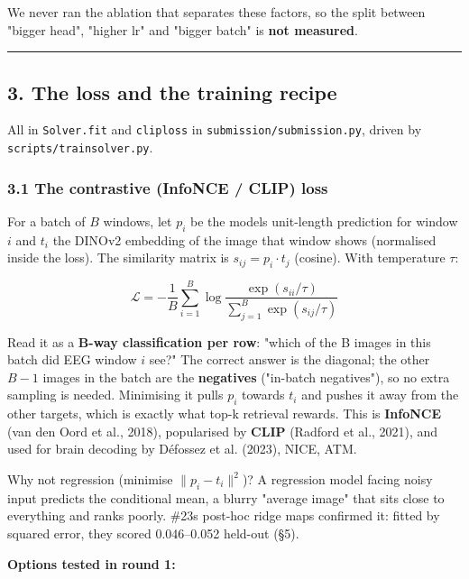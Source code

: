 \documentclass[
  11pt,
]{article}
\renewcommand{\_}{\oldunderscore\allowbreak}
\begin{document}
We never ran the ablation that separates
these factors, so the split between
"bigger head", "higher lr" and "bigger
batch" is \textbf{not measured}.

\begin{center}\rule{0.5\linewidth}{0.5pt}\end{center}

\subsection{3. The loss and the training
recipe}\label{the-loss-and-the-training-recipe}

All in \texttt{Solver.fit} and
\texttt{clip\_loss} in
\texttt{submission/submission.py},
driven by
\texttt{scripts/train\_solver.py}.

\subsubsection{3.1 The contrastive
(InfoNCE / CLIP)
loss}\label{the-contrastive-infonce-clip-loss}

For a batch of \(B\) windows, let
\(p_i\) be the model\textquotesingle s
unit-length prediction for window \(i\)
and \(t_i\) the DINOv2 embedding of the
image that window shows (normalised
inside the loss). The similarity matrix
is \(s_{ij} = p_i \cdot t_j\) (cosine).
With temperature \(\tau\):

\[
\mathcal{L} = -\frac{1}{B}\sum_{i=1}^{B} \log \frac{\exp(s_{ii}/\tau)}{\sum_{j=1}^{B}\exp(s_{ij}/\tau)}
\]

Read it as a \textbf{B-way
classification per row}: "which of the B
images in this batch did EEG window
\(i\) see?" The correct answer is the
diagonal; the other \(B-1\) images in
the batch are the \textbf{negatives}
("in-batch negatives"), so no extra
sampling is needed. Minimising it pulls
\(p_i\) towards \(t_i\) and pushes it
away from the other targets, which is
exactly what top-k retrieval rewards.
This is \textbf{InfoNCE} (van den Oord
et al., 2018), popularised by
\textbf{CLIP} (Radford et al., 2021),
and used for brain decoding by Défossez
et al. (2023), NICE, ATM.

Why not regression (minimise
\(\|p_i - t_i\|^2\))? A regression model
facing noisy input predicts the
conditional mean, a blurry "average
image" that sits close to everything and
ranks poorly. \#23\textquotesingle s
post-hoc ridge maps confirmed it: fitted
by squared error, they scored
0.046--0.052 held-out (§5).

\textbf{Options tested in round 1:}
\end{document}
